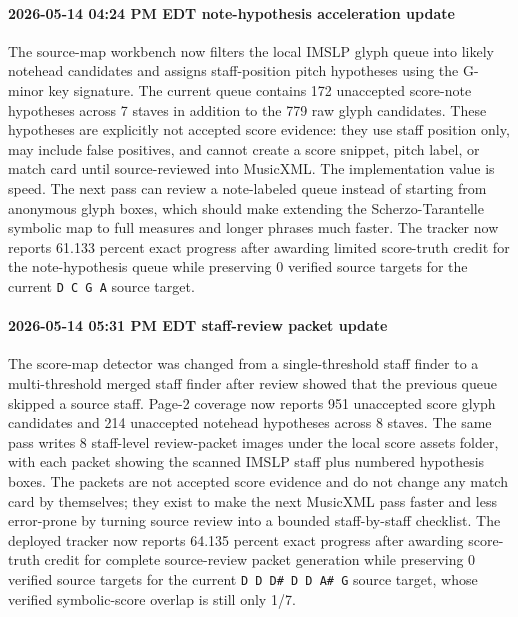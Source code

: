 \paragraph{2026-05-14 04:24 PM EDT note-hypothesis acceleration update} The source-map workbench now filters the local IMSLP glyph queue into likely notehead candidates and assigns staff-position pitch hypotheses using the G-minor key signature. The current queue contains 172 unaccepted score-note hypotheses across 7 staves in addition to the 779 raw glyph candidates. These hypotheses are explicitly not accepted score evidence: they use staff position only, may include false positives, and cannot create a score snippet, pitch label, or match card until source-reviewed into MusicXML. The implementation value is speed. The next pass can review a note-labeled queue instead of starting from anonymous glyph boxes, which should make extending the Scherzo-Tarantelle symbolic map to full measures and longer phrases much faster. The tracker now reports 61.133 percent exact progress after awarding limited score-truth credit for the note-hypothesis queue while preserving 0 verified source targets for the current \texttt{D C G A} source target.

\paragraph{2026-05-14 05:31 PM EDT staff-review packet update} The score-map detector was changed from a single-threshold staff finder to a multi-threshold merged staff finder after review showed that the previous queue skipped a source staff. Page-2 coverage now reports 951 unaccepted score glyph candidates and 214 unaccepted notehead hypotheses across 8 staves. The same pass writes 8 staff-level review-packet images under the local score assets folder, with each packet showing the scanned IMSLP staff plus numbered hypothesis boxes. The packets are not accepted score evidence and do not change any match card by themselves; they exist to make the next MusicXML pass faster and less error-prone by turning source review into a bounded staff-by-staff checklist. The deployed tracker now reports 64.135 percent exact progress after awarding score-truth credit for complete source-review packet generation while preserving 0 verified source targets for the current \texttt{D D D\# D D A\# G} source target, whose verified symbolic-score overlap is still only 1/7.

